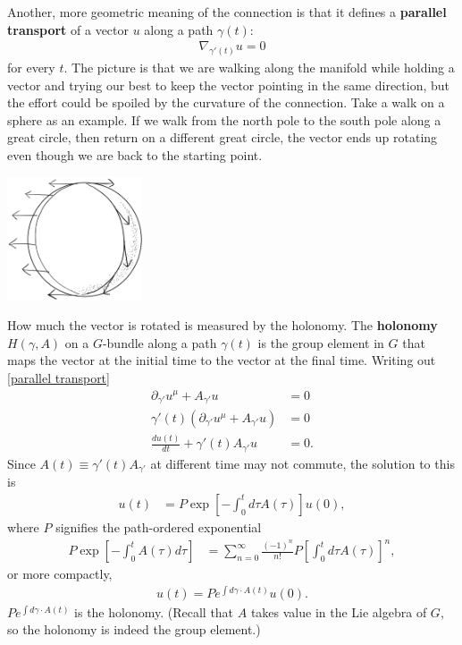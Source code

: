 \documentclass[aps,nofootinbib]{revtex4}
\begin{document}
Another, more geometric meaning of the connection is that it defines a {\bf parallel transport} of a vector $u$ along a path $\gamma (t)$:
\begin{align}\label{parallel transport}
\nabla_{\gamma'(t)} u = 0
\end{align}
for every $t$. The picture is that we are walking along the manifold while holding a vector and trying our best to keep the vector pointing in the same direction, but the effort could be spoiled by the curvature of the connection. Take a walk on a sphere as an example. If we walk from the north pole to the south pole along a great circle, then return on a different great circle, the vector ends up rotating even though we are back to the starting point.
\begin{center}
\includegraphics[width=0.3\textwidth]{parallel.png}
\end{center}
How much the vector is rotated is measured by the holonomy. The {\bf holonomy} $H\left( \gamma, A \right)$ on a $G$-bundle along a path $\gamma(t)$ is the group element in $G$ that maps the vector at the initial time to the vector at the final time. Writing out \eqref{parallel transport}
\begin{align}\label{parallel transport eq}
\partial_{\gamma'} u^{\mu} + A_{\gamma'} u &= 0 \nonumber \\
\gamma'(t) \left( \partial_{\gamma'} u^{\mu} + A_{\gamma'} u \right) &= 0 \nonumber \\
\frac{du(t)}{dt} + \gamma'(t) A_{\gamma'} u &= 0.
\end{align}
Since $A(t) \equiv \gamma'(t) A_{\gamma'} $ at different time may not commute, the solution to this is
\begin{align}
u(t) &= P\exp \left[-\int_0^t d\tau A(\tau) \right] u(0),
\end{align}
where $P$ signifies the path-ordered exponential
\begin{align}
P\exp \left[-\int_0^t A(\tau) d\tau \right] &= \sum_{n=0}^{\infty} \frac{(-1)^n}{n!} P \left[ \int_0^t d\tau A(\tau) \right]^n,
\end{align}
or more compactly,
\begin{align}
u(t) = Pe^{\int d\gamma \cdot A(t)} u(0).
\end{align}
$Pe^{\int d\gamma \cdot A(t)}$ is the holonomy. (Recall that $A$ takes value in the Lie algebra of $G$, so the holonomy is indeed the group element.)
\end{document}
